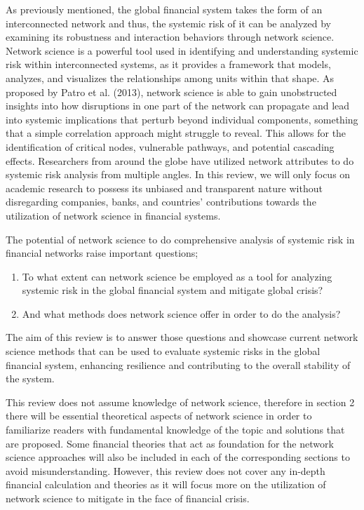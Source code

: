 \documentclass[a4paper,11pt]{article}
\begin{document}
As previously mentioned, the global financial system takes the form of an interconnected network and thus, the systemic risk of it can be analyzed by examining its robustness and interaction behaviors through network science. Network science is a powerful tool used in identifying and understanding systemic risk within interconnected systems, as it provides a framework that models, analyzes, and visualizes the relationships among units within that shape. As proposed by Patro et al. (2013), network science is able to gain unobstructed insights into how disruptions in one part of the network can propagate and lead into systemic implications that perturb beyond individual components, something that a simple correlation approach might struggle to reveal. This allows for the identification of critical nodes, vulnerable pathways, and potential cascading effects. Researchers from around the globe have utilized network attributes to do systemic risk analysis from multiple angles. In this review, we will only focus on academic research  to possess  its unbiased and transparent nature without disregarding companies, banks, and countries’ contributions towards the utilization of network science in financial systems.

The potential of network science to do comprehensive analysis of systemic risk in financial networks raise important questions;
\begin{enumerate}
    \item To what extent can network science be employed as a tool for analyzing systemic risk in the global financial system and mitigate global crisis? 
    \item And what methods does network science offer in order to do the analysis? 
\end{enumerate}
The aim of this review is to answer those questions and showcase current network science methods that can be used to evaluate systemic risks in the global financial system, enhancing resilience and contributing to the overall stability of the system.

This review does not assume knowledge of network science, therefore in section 2 there will be essential theoretical aspects of network science in order to familiarize readers with fundamental knowledge of the topic and solutions that are proposed. Some financial theories that act as foundation for the network science approaches will also be included in each of the corresponding sections to avoid misunderstanding. However, this review does not cover any in-depth financial calculation and theories as it will focus more on the utilization of network science to mitigate in the face of financial crisis.
\end{document}
